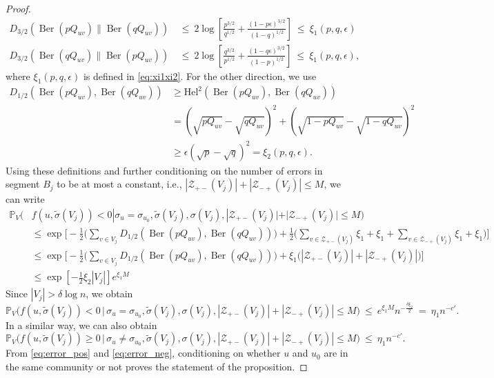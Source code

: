 \documentclass[letterpaper,11pt]{article}
\theoremstyle{definition}
\def\P{\mathbb{P}}
\def\cZ{\mathcal{Z}}
\def\weq{ \ = \ }
\def\wle{ \ \le \ }
\newcommand{\Ber}{\operatorname{Ber}}
\numberwithin{equation}{section}
\newcommand{\eps}{\epsilon}
\theoremstyle{definition}
\def\P{\mathbb{P}}
\def\cZ{\mathcal{Z}}
\def\weq{ \ = \ }
\def\wle{ \ \le \ }
\newcommand{\Ber}{\operatorname{Ber}}
\numberwithin{equation}{section}
\newcommand{\eps}{\epsilon}
\theoremstyle{thmstyletwo}%
\begin{document}
\begin{proof}
\begin{align}
 D_{3/2}(\Ber(pQ_{uv})\|\Ber(qQ_{uv}))
 &\wle 
 2\log \left[\frac{p^{3/2}}{q^{1/2}}+\frac{(1-p\eps)^{3/2}}{(1-q)^{1/2}}\right] 
 \wle 
 \xi_1(p,q,\eps)
 \nonumber\\
 D_{3/2}(\Ber(qQ_{uv}) \| \Ber(pQ_{uv}))
 &\wle 
 2\log \left[\frac{q^{3/2}}{p^{1/2}}+\frac{(1-q\eps)^{3/2}}{(1-p)^{1/2}}\right]
 \wle 
 \xi_1(p,q,\eps),
 \label{eq:xis}
\end{align}
where $\xi_1(p,q,\eps)$ is defined in \eqref{eq:xi1xi2}. For the other direction, we use 
\begin{align*}
D_{1/2}(\Ber(pQ_{uv}),\Ber(qQ_{uv}))&\ge \text{Hel}^2(\Ber(pQ_{uv}),\Ber(qQ_{uv})) \\
&= (\sqrt{pQ_{uv}}-\sqrt{qQ_{uv}})^2+(\sqrt{1-pQ_{uv}}-\sqrt{1-qQ_{uv}})^2\\
& \ge \eps (\sqrt{p}-\sqrt{q})^2 = \xi_2(p,q,\eps).
\end{align*}
Using these definitions and further conditioning on the number of errors in segment $B_j$ to be at most a constant, i.e., $|\cZ_{+-}(V_j)|+|\cZ_{-+}(V_j)| \le M$, we can write
\begin{align*}
\P_V(&f(u,\tilde{\sigma}(V_j)) <0|\sigma_u=\sigma_{u_0},\tilde{\sigma}(V_j),\sigma(V_j),|\cZ_{+-}(V_j)|+|\cZ_{-+}(V_j)| \le M)\\
&\le 
\exp\Bigg[-\frac{1}{2}\Bigg(\sum_{v\in V_j}D_{1/2}\left(\Ber(pQ_{uv}),\Ber(qQ_{uv})\right)\Bigg)+\frac{1}{2}\Bigg(\sum_{v\in \cZ_{+-}(V_j)}\xi_1+\xi_1+\sum_{v\in \cZ_{-+}(V_j)}\xi_1+\xi_1\Bigg)\Bigg]\\
&\le 
\exp\Bigg[-\frac{1}{2}\Bigg(\sum_{v\in V_j}D_{1/2}\left(\Ber(pQ_{uv}),\Ber(qQ_{uv})\right)\Bigg)+\xi_1\big(|\cZ_{+-}(V_j)|+|\cZ_{-+}(V_j)|\big)\Bigg]\\
&\le 
\exp\left[-\frac{1}{2}\xi_2 |V_j|\right]e^{\xi_1 M}
\end{align*}
Since $|V_j|>\delta \log n$, we obtain 
\begin{equation}
 \P_V\Big( f(u,\tilde{\sigma}(V_j)) <0 \, \Big| \, \sigma_u=\sigma_{u_0},\tilde{\sigma}(V_j),\sigma(V_j),|\cZ_{+-}(V_j)|+|\cZ_{-+}(V_j)| \le M \Big)
 \wle 
 e^{\xi_1 M} n^{-\frac{\delta \xi_2}{2}}
 \weq 
 \eta_1 n^{-c'}.
 \label{eq:error_pos}
\end{equation}
In a similar way, we can also obtain
\begin{equation}
 \P_V\Big( f(u,\tilde{\sigma}(V_j)) \ge 0 \, \Big| \, \sigma_u\neq \sigma_{u_0},\tilde{\sigma}(V_j),\sigma(V_j),|\cZ_{+-}(V_j)|+|\cZ_{-+}(V_j)| \le M \Big)
 \wle 
 \eta_1 n^{-c'}.
\label{eq:error_neg}
\end{equation}
From \eqref{eq:error_pos} and \eqref{eq:error_neg}, conditioning on whether $u$ and $u_0$ are in the same community or not proves the statement of the proposition.
\end{proof}
\end{document}
